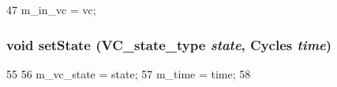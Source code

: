 \begin{DoxyCode}
47 { m_in_vc = vc; }
\end{DoxyCode}
\hypertarget{classOutVcState__d_a4ac4ce58e7eac1aee69c9891552538ec}{
\subsubsection[{setState}]{\setlength{\rightskip}{0pt plus 5cm}void setState ({\bf VC\_\-state\_\-type} {\em state}, \/  {\bf Cycles} {\em time})}}
\label{classOutVcState__d_a4ac4ce58e7eac1aee69c9891552538ec}



\begin{DoxyCode}
55     {
56         m_vc_state = state;
57         m_time = time;
58     }
\end{DoxyCode}


